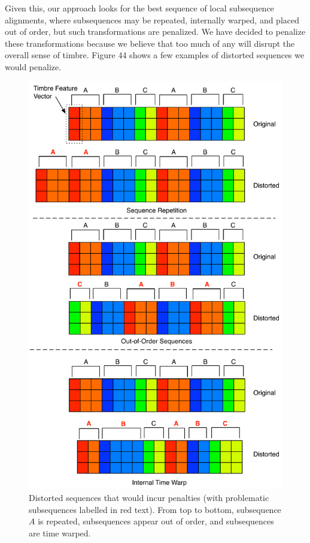 \documentclass[12pt]{report} 	%
\numberwithin{figure}{chapter}
\numberwithin{table}{chapter}
\numberwithin{equation}{chapter}
\begin{document}
\begin{flushleft}
Given this, our approach looks for the best sequence of local subsequence alignments, where subsequences may be repeated, internally warped, and placed out of order, but such transformations are penalized. We have decided to penalize these transformations because we believe that too much of any will disrupt the overall sense of timbre. Figure 44 shows a few examples of distorted sequences we would penalize.
\begin{figure}[!p]
\begin{center}
\includegraphics[scale = 0.6]{SequencePenalties}
\caption[Proposed sequence similarity penalties]{Distorted sequences that would incur penalties (with problematic subsequences labelled in red text). From top to bottom, subsequence $A$ is repeated, subsequences appear out of order, and subsequences are time warped.}
\end{center}
\end{figure}


\end{flushleft}
\end{document}
